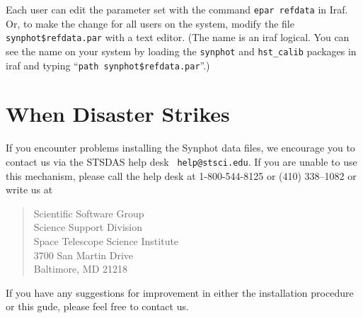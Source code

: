 \documentclass{article}
\begin{document}
Each user can edit the parameter set with the command {\tt epar
refdata} in Iraf. Or, to make the change for all users on the system,
modify the file {\tt synphot\$refdata.par} with a text editor. (The
name is an iraf logical. You can see the name on your system by
loading the {\tt synphot} and {\tt hst\_calib} packages in iraf and
typing ``{\tt path synphot\$refdata.par}''.)

\section{When Disaster Strikes}

If you encounter problems installing the Synphot data files, we
encourage you to contact us via the STSDAS help desk {\tt
help@stsci.edu}.  If you are unable to use this mechanism, please call
the help desk at 1-800-544-8125 or (410) 338--1082 or write us at

\begin{quote}
Scientific Software Group\\
Science Support Division\\
Space Telescope Science Institute\\
3700 San Martin Drive\\
Baltimore, MD 21218
\end{quote}

If you have any suggestions for improvement in either the installation
procedure or this gude, please feel free to contact us.
\end{document}
